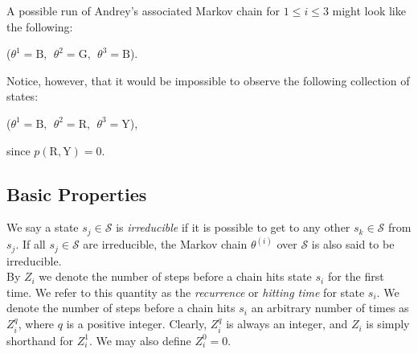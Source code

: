 \documentclass[12pt,twoside]{reedthesis}
\begin{document}
	A possible run of Andrey's associated Markov chain for $1 \leq i \leq 3$ might look like the following:
	\begin{center}
		($\theta^{1} = \textrm{B},\ \  \theta^{2} = \textrm{G},\ \ \theta^{3} = \textrm{B}$).
	\end{center}
	Notice, however, that it would be impossible to observe the following collection of states:
	\begin{center}
		($\theta^{1} = \textrm{B},\ \ \theta^{2} = \textrm{R},\ \  \theta^{3} = \textrm{Y}$),
	\end{center}
	since $p(\textrm{R}, \textrm{Y}) = 0$.

		\subsection*{Basic Properties}
		We say a state $s_j \in \mathcal{S}$ is {\em irreducible} if it is possible to get to any other $s_k \in \mathcal{S}$ from $s_j$. If all $s_j \in \mathcal{S}$ are irreducible, the Markov chain $\theta^{(i)}$ over $\mathcal{S}$ is also said to be irreducible. \\
		
		By $Z_i$ we denote the number of steps before a chain hits state $s_i$ for the first time. 
		We refer to this quantity as the {\em recurrence} or {\em hitting time} for state $s_i$.
		We denote the number of steps before a chain hits $s_i$ an arbitrary number of times as $Z^{q}_i$, where $q$ is a positive integer. Clearly, $Z^{q}_i$ is always an integer, and $Z_i$ is simply shorthand for $Z^{1}_i$. We may also define $Z^{0}_i = 0$. \\
		
\end{document}
